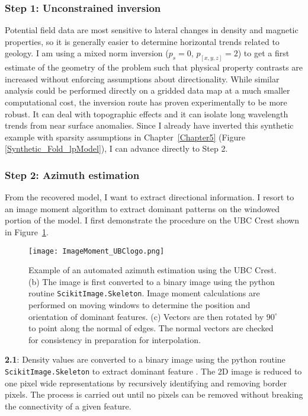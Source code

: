 \subsubsection{Step 1: Unconstrained inversion}
Potential field data are most sensitive to lateral changes in density and magnetic properties, so it is generally easier to determine horizontal trends related to geology. I am using a mixed norm inversion ($p_s=0$, $p_{[x,y,z]}=2$) to get a first estimate of the geometry of the problem such that physical property contrasts are increased without enforcing assumptions about directionality.
While similar analysis could be performed directly on a gridded data map at a much smaller computational cost, the inversion route has proven experimentally to be more robust. It can deal with topographic effects and it can isolate long wavelength trends from near surface anomalies. Since I already have inverted this synthetic example with sparsity assumptions in Chapter~\ref{Chapter5} (Figure~
\ref{Synthetic_Fold_lpModel}), I can advance directly to Step 2.

\subsubsection{Step 2: Azimuth estimation}
From the recovered model, I want to extract directional information. I resort to an image moment algorithm to extract dominant patterns on the windowed portion of the model. I first demonstrate the procedure on the UBC Crest shown in Figure~\ref{ImageMoment_UBC}.
\begin{figure}\centering
\texttt{[image: ImageMoment\_UBClogo.png]}
\caption{Example of an automated azimuth estimation using the UBC Crest. (b) The image is first converted to a binary image using the python routine \texttt{ScikitImage.Skeleton}. Image moment calculations are performed on moving windows to determine the position and orientation of dominant features. (c) Vectors are then rotated by $90^\circ$ to point along the normal of edges. The normal vectors are checked for consistency in preparation for interpolation.}
\label{ImageMoment_UBC}
\end{figure}

\textbf{2.1}: Density values are converted to a binary image using the python routine \texttt{ScikitImage.Skeleton} to extract dominant feature \cite[]{Lee1994}. The 2D image is reduced to one pixel wide representations by recursively identifying and removing border pixels. The process is carried out until no pixels can be removed without breaking the connectivity of a given feature.

